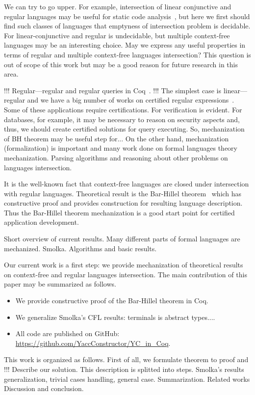 We can try to go upper.
For example, intersection of linear conjunctive and regular languages may be useful for static code analysis~\cite{zhang2017context}, but here we first should find such classes of languages that emptyness of intersection problem is decidable.
For linear-conjunctive and regular is undecidable, but multiple context-free languages may be an interesting choice.
May we express any useful properties in terms of regular and multiple context-free languages intersection? 
This question is out of scope of this work but may be a good reason for future research in this area.

!!! Regular---regular and regular queries in Coq~\cite{!!!}.
!!! The simplest case is linear---regular and we have a big number of works on certified regular expressions~\cite{!!!}.
Some of these applications require certifications. 
For verification is evident.
For databases, for example, it may be necessary to reason on security aspects and, thus, we should create certified solutions for query executing.
So, mechanization of BH theorem may be useful step for...
On the other hand, mechanization (formalization) is important and many work done on formal languages theory mechanization. 
Parsing algorithms and reasoning about other problems on languages intersection.

It is the well-known fact that context-free languages are closed under intersection with regular languages. 
Theoretical result is the Bar-Hillel theorem~\cite{bar1961formal} which has constructive proof and provides construction for resulting language description.
Thus the Bar-Hillel theorem mechanization is a good start point for certified application development.

Short overview of current results.
Many different parts of formal languages are mechanized. 
Smolka.
Algorithms and basic results.

Our current work is a first step: we provide mechanization of theoretical results on context-free and regular languages intersection.
The main contribution of this paper may be summarized as follows.
\begin{itemize}
\item We provide constructive proof of the Bar-Hillel theorem in Coq.
\item We generalize Smolka's CFL results: terminals is abstract types....
\item All code are published on GitHub: \url{https://github.com/YaccConstructor/YC_in_Coq}.
\end{itemize}

This work is organized as follows. First of all, we formulate theorem to proof and !!!
Describe our solution. This description is splitted into steps.
Smolka's results generalization, trivial cases handling, general case. 
Summarization.
Related works
Discussion and conclusion.

